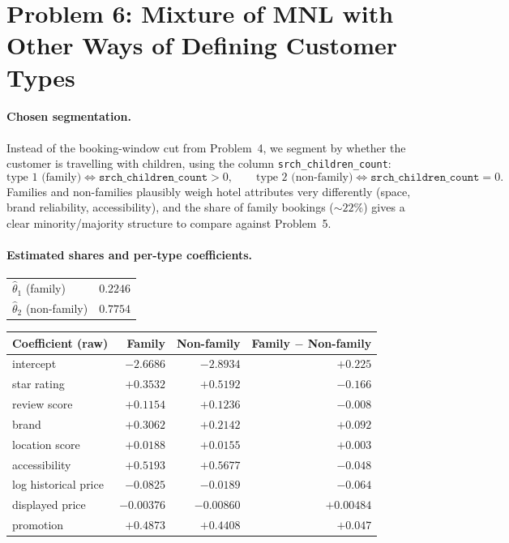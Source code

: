 \documentclass[11pt]{article}
\begin{document}
\FloatBarrier
\newpage

\section*{Problem 6: Mixture of MNL with Other Ways of Defining Customer Types}
\label{sec:p6}

\paragraph{Chosen segmentation.}
Instead of the booking-window cut from Problem~4, we segment by whether the
customer is travelling with children, using the column
\texttt{srch\_children\_count}:
\[
\text{type 1 (family)} \iff \texttt{srch\_children\_count} > 0,
\qquad
\text{type 2 (non-family)} \iff \texttt{srch\_children\_count} = 0.
\]
Families and non-families plausibly weigh hotel attributes very differently
(space, brand reliability, accessibility), and the share of family bookings
($\sim\!22\%$) gives a clear minority/majority structure to compare against
Problem~5.

\paragraph{Estimated shares and per-type coefficients.}
\begin{center}
\begin{tabular}{lr}
\toprule
$\hat\theta_1$ (family)     & $0.2246$ \\
$\hat\theta_2$ (non-family) & $0.7754$ \\
\bottomrule
\end{tabular}
\end{center}

\begin{center}
\begin{tabular}{lrrr}
\toprule
Coefficient (raw) & Family & Non-family & Family $-$ Non-family \\
\midrule
intercept                    & $-2.6686$ & $-2.8934$ & $+0.225$  \\
star rating                  & $+0.3532$ & $+0.5192$ & $-0.166$  \\
review score                 & $+0.1154$ & $+0.1236$ & $-0.008$  \\
brand                        & $+0.3062$ & $+0.2142$ & $+0.092$  \\
location score               & $+0.0188$ & $+0.0155$ & $+0.003$  \\
accessibility                & $+0.5193$ & $+0.5677$ & $-0.048$  \\
log historical price         & $-0.0825$ & $-0.0189$ & $-0.064$  \\
displayed price              & $-0.00376$ & $-0.00860$ & $+0.00484$ \\
promotion                    & $+0.4873$ & $+0.4408$ & $+0.047$  \\
\bottomrule
\end{tabular}
\end{center}
\end{document}
